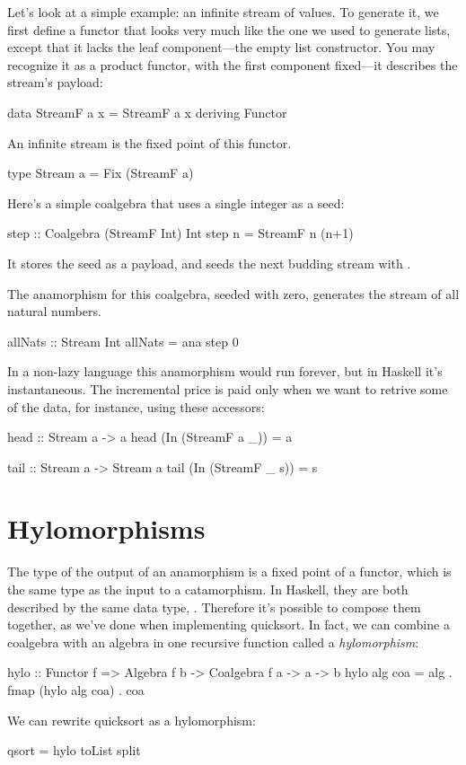\documentclass[DaoFP]{subfiles}
\begin{document}
Let's look at a simple example: an infinite stream of values. To generate it, we first define a functor that looks very much like the one we used to generate lists, except that it lacks the leaf component---the empty list constructor. You may recognize it as a product functor, with the first component fixed---it describes the stream's payload:
\begin{haskell}
data StreamF a x = StreamF a x
  deriving Functor
\end{haskell}
An infinite stream is the fixed point of this functor.
\begin{haskell}
type Stream a = Fix (StreamF a)
\end{haskell}
Here's a simple coalgebra that uses a single integer  as a seed:
\begin{haskell}
step :: Coalgebra (StreamF Int) Int
step n = StreamF n (n+1)
\end{haskell}
It stores the seed as a payload, and seeds the next budding stream with . 

The anamorphism for this coalgebra, seeded with zero, generates the stream of all natural numbers.
\begin{haskell}
allNats :: Stream Int
allNats = ana step 0
\end{haskell}
In a non-lazy language this anamorphism would run forever, but in Haskell it's instantaneous. The incremental price is paid only when we want to retrive some of the data, for instance, using these accessors:
\begin{haskell}
head :: Stream a -> a
head (In (StreamF a _)) = a

tail :: Stream a -> Stream a
tail (In (StreamF _ s)) = s
\end{haskell}


\section{Hylomorphisms}

The type of the output of an anamorphism is a fixed point of a functor, which is the same type as the input to a catamorphism. In Haskell, they are both described by the same data type, . Therefore it's possible to compose them together, as we've done when implementing quicksort. In fact, we can combine a coalgebra with an algebra in one recursive function called a \emph{hylomorphism}:
\begin{haskell}
hylo :: Functor f => Algebra f b -> Coalgebra f a -> a -> b
hylo alg coa = alg . fmap (hylo alg coa) . coa 
\end{haskell}
We can rewrite quicksort as a hylomorphism:
\begin{haskell}
qsort = hylo toList split
\end{haskell}
\end{document}
